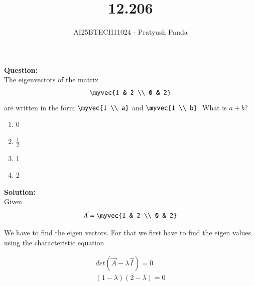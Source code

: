 \documentclass[journal]{IEEEtran}
\begin{document}

\vspace{3cm}

\title{12.206}
\author{AI25BTECH11024 - Pratyush Panda
}
\maketitle
{\let\newpage\relax\maketitle}

\renewcommand{\thefigure}{\theenumi}
\renewcommand{\thetable}{\theenumi}
\setlength{\intextsep}{10pt} %


\renewcommand{\thetable}{\theenumi}

\textbf{Question: } \\
The eigenvectors of the matrix 
\begin{align}
\myvec{1 & 2 \\ 0 & 2}
\end{align}
are written in the form $\myvec{1 \\ a}$ and $\myvec{1 \\ b}$. What is $a+b$?
\begin{enumerate}
\item[a] 0
\item[b] $\frac{1}{2}$
\item[c] 1
\item[d] 2
\end{enumerate}
\vspace{0.7cm}

\renewcommand{\theequation}{0.\arabic{equation}}

\textbf{Solution: } \\
Given
\begin{align}
\Vec{A} = \myvec{1 & 2 \\ 0 & 2}
\end{align}

We have to find the eigen vectors. For that we first have to find the eigen values using the characteristic equation

\begin{align}
det(\Vec{A} - \lambda \Vec{I}) = 0 \\
(1 - \lambda)(2 - \lambda) = 0 \\
\end{align}
\end{document}
